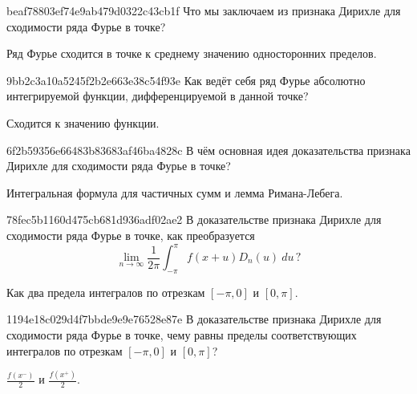 \begin{note}{beaf78803ef74e9ab479d0322c43cb1f}
    Что мы заключаем из признака Дирихле для сходимости ряда Фурье в точке?

    \begin{cloze}{1}
        Ряд Фурье сходится в точке к среднему значению односторонних пределов.
    \end{cloze}
\end{note}

\begin{note}{9bb2c3a10a5245f2b2e663e38c54f93e}
    Как ведёт себя ряд Фурье абсолютно интегрируемой функции, дифференцируемой в данной точке?

    \begin{cloze}{1}
        Сходится к значению функции.
    \end{cloze}
\end{note}

\begin{note}{6f2b59356e66483b83683af46ba4828c}
    В чём основная идея доказательства признака Дирихле для сходимости ряда Фурье в точке?

    \begin{cloze}{1}
        Интегральная формула для частичных сумм и лемма Римана-Лебега.
    \end{cloze}
\end{note}

\begin{note}{78fec5b1160d475cb681d936adf02ae2}
    В доказательстве признака Дирихле для сходимости ряда Фурье в точке, как преобразуется
    \[
        \lim_{n \to \infty} \frac{1}{2\pi} \int_{-\pi}^{\pi} f(x+u) D_n(u)\: du\,?
    \]

    \begin{cloze}{1}
        Как два предела интегралов по отрезкам \({ [-\pi, 0] }\) и \({ [0, \pi] }\).
    \end{cloze}
\end{note}

\begin{note}{1194e18c029d4f7bbde9e9e76528e87e}
    В доказательстве признака Дирихле для сходимости ряда Фурье в точке, чему равны пределы соответствующих интегралов по отрезкам \({ [-\pi, 0] }\) и \({ [0, \pi] }\)?

    \begin{cloze}{1}
        \({ \frac{f(x^{-})}{2} }\) и \({ \frac{f(x^{+})}{2} }\).
    \end{cloze}
\end{note}

